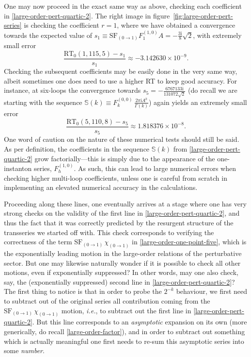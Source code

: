 \documentclass[11pt,a4paper]{article}
\def\BS{{\mathbb S}}
\newcommand{\be}{\begin{equation}}
\newcommand{\ee}{\end{equation}}
\newcommand{\rmi}{{\mathrm{i}}}
\begin{document}
One may now proceed in the exact same way as above, checking each coefficient in \eqref{large-order-pert-quartic-2}. The right image in figure~\ref{fig:large-order-pert-series} is checking the coefficient $r=1$, where we have obtained a convergence towards the expected value of $s_1 \equiv \mathrm{SF}_{(0\rightarrow1)} F_1^{(1,0)} A = -\frac{3\rmi}{8}\sqrt{2}$, with extremely small error
%
\be
\frac{\mathrm{RT}_0 (1,115,5) - s_1}{s_1} \approx -3.142630 \times 10^{-9}.
\ee
%
\noindent
Checking the subsequent coefficients may be easily done in the very same way, albeit sometimes one does need to use a higher RT to keep good accuracy. For instance, at six-loops the convergence towards $s_{5} = -\frac{6767133\rmi}{131072\sqrt{2}}$ (do recall we are starting with the sequence $\BS(k) \equiv F_k^{(0,0)}\, \frac{2\pi\rmi A^k}{\Gamma(k)}$) again yields an extremely small error
%
\be
\frac{\mathrm{RT}_0 (5,110,8) - s_{5}}{s_{5}} \approx 1.818376 \times 10^{-8}.
\ee
%
\noindent
One word of caution on the nature of these numerical tests should still be said. As per definition, the coefficients in the sequence $\BS(k)$ from \eqref{large-order-pert-quartic-2} grow factorially---this is simply due to the appearance of the one-instanton series, $F_h^{(1,0)}$. As such, this can lead to large numerical errors when checking higher multi-loop coefficients, unless one is careful from scratch in implementing an elevated numerical accuracy in the calculations.

Proceeding along these lines, one eventually arrives at a stage where one has very strong checks on the validity of the first line in \eqref{large-order-pert-quartic-2}, and thus the fact that it was correctly predicted by the resurgent structure of the transseries we started off with. This check corresponds to verifying the correctness of the term $\mathrm{SF}_{(0\rightarrow1)}\, \chi_{(0\rightarrow1)}$ in \eqref{large-order-one-point-five}, which is the exponentially leading motion in the large-order relations of the perturbative sector. But one may likewise naturally wonder if it is possible to check all other motions, even if exponentially suppressed? In other words, may one also check, say, the (exponentially suppressed) second line in \eqref{large-order-pert-quartic-2}? The first thing to notice is that in order to probe the $2^{-k}$ behaviour, we first need to subtract out of the original series all contribution coming from the $\mathrm{SF}_{(0\rightarrow1)}\, \chi_{(0\rightarrow1)}$ motion, \textit{i.e.}, to subtract out the first line in \eqref{large-order-pert-quartic-2}. But this line corresponds to an \textit{asymptotic} expansion on its own (more generically, do recall \eqref{large-order-factor}), and in order to subtract out something which is actually meaningful one first needs to re-sum this asymptotic series into some \textit{number}.
\end{document}
